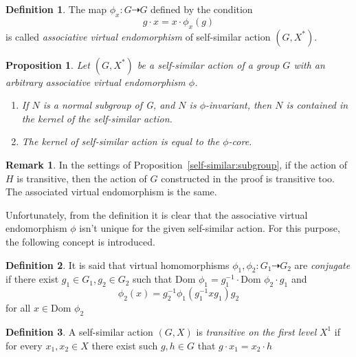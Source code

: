 \documentclass[a4paper,12pt]{amsart}
\newtheorem{proposition}[theorem]{Proposition}
\theoremstyle{definition}
\newtheorem{definition}{Definition}
\newtheorem{remark}{Remark}
\newcommand{\Dom}{\text{Dom }}
\begin{document}
	
	\begin{definition}
		
		The map $\phi_x : G \dashrightarrow G$ defined by the condition
		$$
		g \cdot x = x \cdot \phi_x (g)
		$$ 
		is called \textit{associative virtual endomorphism} of self-similar action $(G, X^*)$.
	\end{definition}
	
	\begin{proposition}
		Let $(G, X^*)$ be a self-similar action of a group $G$ with an arbitrary associative virtual endomorphism $\phi$. 
		
		\begin{enumerate}[label=\arabic*.]
			\item If $N$ is a normal subgroup of G, and $N$ is $\phi$-invariant, then $N$ is contained in the kernel of the self-similar action.
			
			\item The kernel of self-similar action is equal to the $\phi$-core.
		\end{enumerate} 
		
	\end{proposition}
	
	\begin{remark}
		In the settings of Proposition~\ref{self-similar:subgroup}, if the action of $H$ is transitive, then the action of $G$ constructed in the proof is transitive too. The associated virtual endomorphism is the same.
		
	\end{remark}
	
	
	Unfortunately, from the definition it is clear that the associative virtual endomorphism $\phi$ isn't unique for the given self-similar action. For this purpose, the following concept is introduced. 
	
	\begin{definition}
		It is said that virtual homomorphisms $\phi_1, \phi_2: G_1 \dashrightarrow G_2$ are \textit{conjugate} if there exist $g_1 \in G_1, g_2 \in G_2$ such that $\Dom \phi_1 = g_1^{-1} \cdot \Dom \phi_2 \cdot g_1$ and 
		$$
		\phi_2(x) = g_2^{-1}\phi_1(g_1^{-1}xg_1)g_2
		$$
		for all $x \in \Dom \phi_2$
	\end{definition}
	
	
	\begin{definition}
		A self-similar action $(G, X)$ is \textit{transitive on the first level} $X^{1} $ if for every $x_1, x_2 \in X$ there exist such $g, h \in G$ that $g \cdot x_1 = x_2 \cdot h$
	\end{definition}
	
\end{document}
